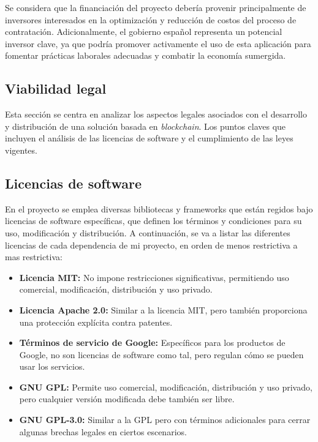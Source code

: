 Se considera que la financiación del proyecto debería provenir principalmente de inversores interesados en la optimización y reducción de costos del proceso de contratación.
Adicionalmente, el gobierno español representa un potencial inversor clave, ya que podría promover activamente el uso de esta aplicación para fomentar prácticas laborales adecuadas y combatir la economía sumergida. 


\subsection{Viabilidad legal}

Esta sección se centra en analizar los aspectos legales asociados con el desarrollo y distribución de una solución basada en \textit{blockchain}.
Los puntos claves que incluyen el análisis de las licencias de software y el cumplimiento de las leyes vigentes.

\subsection{Licencias de software}

En el proyecto se emplea diversas bibliotecas y frameworks que están regidos bajo licencias de software específicas, que definen los términos y condiciones para su uso, modificación y distribución.
A continuación, se va a listar las diferentes licencias de cada dependencia de mi proyecto, en orden de menos restrictiva a mas restrictiva:

\begin{itemize}

\item \textbf{Licencia MIT:} No impone restricciones significativas, permitiendo uso comercial, modificación, distribución y uso privado.

\item \textbf{Licencia Apache 2.0:} Similar a la licencia MIT, pero también proporciona una protección explícita contra patentes.

\item \textbf{Términos de servicio de Google:} Específicos para los productos de Google, no son licencias de software como tal, pero regulan cómo se pueden usar los servicios.

\item \textbf{GNU GPL:} Permite uso comercial, modificación, distribución y uso privado, pero cualquier versión modificada debe también ser libre.

\item \textbf{GNU GPL-3.0:} Similar a la GPL pero con términos adicionales para cerrar algunas brechas legales en ciertos escenarios.

\end{itemize}


